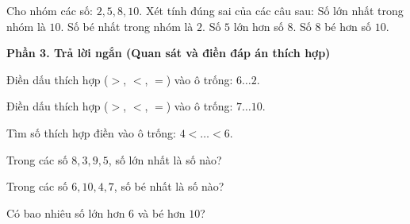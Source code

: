 \begin{ex} %
Cho nhóm các số: $2, 5, 8, 10$. Xét tính đúng sai của các câu sau:
\choiceTF
{\True Số lớn nhất trong nhóm là $10$.}
{\True Số bé nhất trong nhóm là $2$.}
{Số $5$ lớn hơn số $8$.}
{\True Số $8$ bé hơn số $10$.}
\end{ex}

\textbf{Phần 3. Trả lời ngắn (Quan sát và điền đáp án thích hợp)}

\begin{ex} %
Điền dấu thích hợp ($>$, $<$, $=$) vào ô trống: $6 \dots 2$.
\shortans{>}
\end{ex}

\begin{ex} %
Điền dấu thích hợp ($>$, $<$, $=$) vào ô trống: $7 \dots 10$.
\shortans{<}
\end{ex}

\begin{ex} %
Tìm số thích hợp điền vào ô trống: $4 < \dots < 6$.
\end{ex}

\begin{ex} %
Trong các số $8, 3, 9, 5$, số lớn nhất là số nào?
\end{ex}

\begin{ex} %
Trong các số $6, 10, 4, 7$, số bé nhất là số nào?
\end{ex}

\begin{ex} %
Có bao nhiêu số lớn hơn $6$ và bé hơn $10$?
\end{ex}
